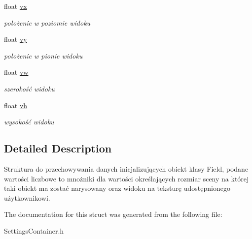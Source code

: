 \begin{DoxyCompactItemize}
float \mbox{\hyperlink{struct_field_initializer_af3d1f6a815efcd52d4c8aae8b182b7e5}{vx}}
\begin{DoxyCompactList}\small\item\em położenie w poziomie widoku \end{DoxyCompactList}\item 
\mbox{\label{struct_field_initializer_a58fa054f871c0d24df719d6a8dd22a50}} 
float \mbox{\hyperlink{struct_field_initializer_a58fa054f871c0d24df719d6a8dd22a50}{vy}}
\begin{DoxyCompactList}\small\item\em położenie w pionie widoku \end{DoxyCompactList}\item 
\mbox{\label{struct_field_initializer_af969fe791f36096bf711f05eb418c283}} 
float \mbox{\hyperlink{struct_field_initializer_af969fe791f36096bf711f05eb418c283}{vw}}
\begin{DoxyCompactList}\small\item\em szerokość widoku \end{DoxyCompactList}\item 
\mbox{\label{struct_field_initializer_a50c689fe0ac19d01d84d005dc5b8cd7a}} 
float \mbox{\hyperlink{struct_field_initializer_a50c689fe0ac19d01d84d005dc5b8cd7a}{vh}}
\begin{DoxyCompactList}\small\item\em wysokość widoku \end{DoxyCompactList}\end{DoxyCompactItemize}


\subsection{Detailed Description}
Struktura do przechowywania danych inicjalizujących obiekt klasy Field, podane wartości liczbowe to mnożniki dla wartości określających rozmiar sceny na której taki obiekt ma zostać narysowany oraz widoku na teksturę udostępnionego użytkownikowi. 

The documentation for this struct was generated from the following file\+:\begin{DoxyCompactItemize}
\item 
Settings\+Container.\+h\end{DoxyCompactItemize}
